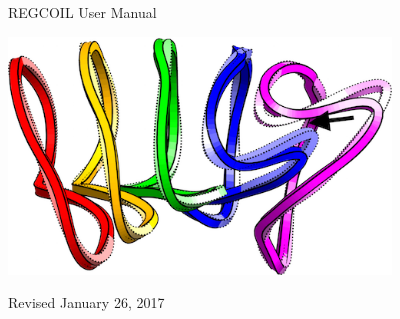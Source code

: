 \begin{center}

\vspace*{2in}

{\Huge REGCOIL User Manual}

\vspace{1in}

\centerline{\includegraphics[width=4in]{m20160801_01_compareNescoilToRegcoilCoils.png}}


\vspace{2.0in}

Revised January 26, 2017

\end{center}


